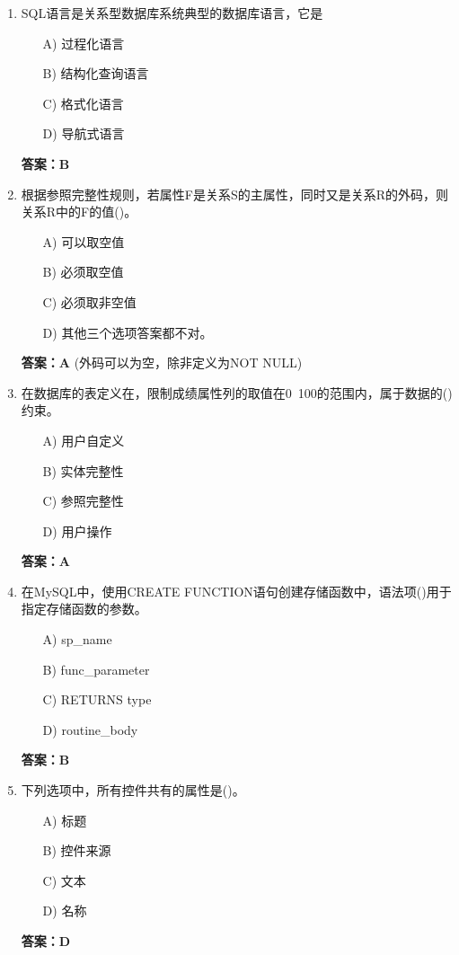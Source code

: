 \documentclass[a4paper,12pt]{article}
\begin{document}
\begin{enumerate}[label=\arabic*.]
\item SQL语言是关系型数据库系统典型的数据库语言，它是
\begin{itemize}
    \item[A)] 过程化语言
    \item[B)] 结构化查询语言
    \item[C)] 格式化语言
    \item[D)] 导航式语言
\end{itemize}
\textbf{答案：B}

\item 根据参照完整性规则，若属性F是关系S的主属性，同时又是关系R的外码，则关系R中的F的值()。
\begin{itemize}
    \item[A)] 可以取空值
    \item[B)] 必须取空值
    \item[C)] 必须取非空值
    \item[D)] 其他三个选项答案都不对。
\end{itemize}
\textbf{答案：A} (外码可以为空，除非定义为NOT NULL)

\item 在数据库的表定义在，限制成绩属性列的取值在0~100的范围内，属于数据的()约束。
\begin{itemize}
    \item[A)] 用户自定义
    \item[B)] 实体完整性
    \item[C)] 参照完整性
    \item[D)] 用户操作
\end{itemize}
\textbf{答案：A}

\item 在MySQL中，使用CREATE FUNCTION语句创建存储函数中，语法项()用于指定存储函数的参数。
\begin{itemize}
    \item[A)] sp\_name
    \item[B)] func\_parameter
    \item[C)] RETURNS type
    \item[D)] routine\_body
\end{itemize}
\textbf{答案：B}

\item 下列选项中，所有控件共有的属性是()。
\begin{itemize}
    \item[A)] 标题
    \item[B)] 控件来源
    \item[C)] 文本
    \item[D)] 名称
\end{itemize}
\textbf{答案：D}


\end{enumerate}
\end{document}
